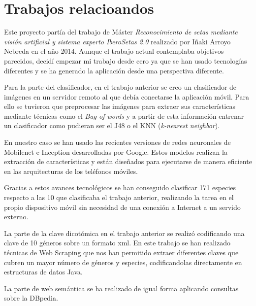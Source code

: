 

\section{Trabajos relacioandos}

Este proyecto partía del trabajo de Máster \textit{Reconocimiento de setas mediante visión artificial y sistema experto IberoSetas 2.0} realizado por Iñaki Arroyo Nebreda en el año 2014. Aunque el trabajo actual contemplaba objetivos parecidos, decidí empezar mi trabajo desde cero ya que se han usado tecnologías diferentes y se ha generado la aplicación desde una perspectiva diferente. \cite{iberosetas}

Para la parte del clasificador, en el trabajo anterior se creo un clasificador de imágenes en un servidor remoto al que debía conectarse la aplicación móvil. Para ello se tuvieron que preprocesar las imágenes para extraer sus características mediante técnicas como el \textit{Bag of words} y a partir de esta información entrenar un clasificador como pudieran ser el J48 o el KNN (\textit{k-nearest neighbor}).

En nuestro caso se han usado las recientes versiones de redes neuronales de Mobilenet e Inception desarrolladas por Google. Estos modelos realizan la extracción de características y están diseñados para ejecutarse de manera eficiente en las arquitecturas de los teléfonos móviles.

Gracias a estos avances tecnológicos se han conseguido clasificar 171 especies respecto a las 10 que clasificaba el trabajo anterior, realizando la tarea en el propio dispositivo móvil sin necesidad de una conexión a Internet a un servido externo.

La parte de la clave dicotómica en el trabajo anterior se realizó codificando una clave de 10 géneros sobre un formato xml. En este trabajo se han realizado técnicas de Web Scraping que nos han permitido extraer diferentes claves que cubren un mayor número de géneros y especies, codificandolas directamente en estructuras de datos Java.

La parte de web semántica se ha realizado de igual forma aplicando consultas sobre la DBpedia.

